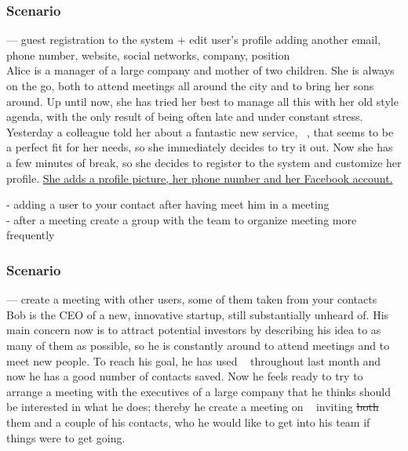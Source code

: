 
\subsubsection{Scenario \thecountScenarios }
--- guest registration  to the system + edit user's profile adding another email, phone number, website, social networks, company, position \\

Alice is a manager of a large company and mother of two children. She is always on the go, both to attend meetings all around the city and to bring her sons around. Up until now, she has tried her best to manage all this with her old style agenda, with the only result of being often late and under constant stress. Yesterday a colleague told her about a fantastic new service, \projectname~, that seems to be a perfect fit for her needs, so she immediately decides to try it out. Now she has a few minutes of break, so she decides to register to the system and customize her profile. \underline{She adds a profile picture, her phone number and her Facebook account.}

- adding a user to your contact after having meet him in a meeting \\
- after a meeting create a group with the team to organize meeting more frequently \\


\subsubsection{Scenario \thecountScenarios }
--- create a meeting with other users, some of them taken from your contacts\\

Bob is the CEO of a new, innovative startup, still substantially unheard of. His main concern now is to attract potential investors by describing his idea to as many of them as possible, so he is constantly around to attend meetings and to meet new people. To reach his goal, he has used \projectname~ throughout last month and now he has a good number of contacts saved. Now he feels ready to try to arrange a meeting with the executives of a large company that he thinks should be interested in what he does; thereby he create a meeting on \projectname~ inviting \st{both} them and a couple of his contacts, who he would like to get into his team if things were to get going.

